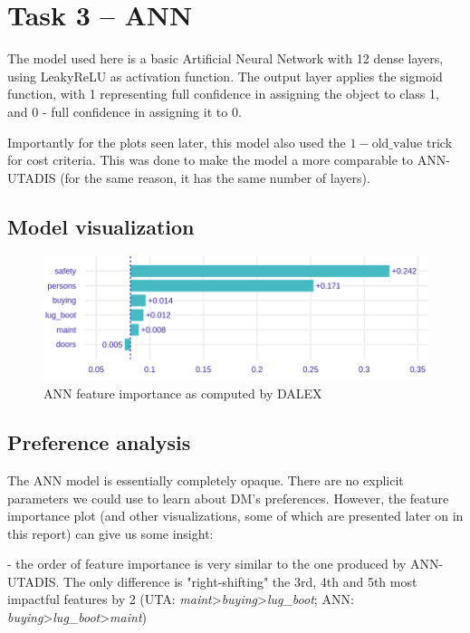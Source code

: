 \documentclass[../main.tex]{subfiles}
\begin{document}
\section{Task 3 -- ANN}

The model used here is a basic Artificial Neural Network with 12 dense layers,
using LeakyReLU as activation function. The output layer applies the sigmoid
function, with 1 representing full confidence in assigning the object to class 1, and 0
- full confidence in assigning it to 0.

Importantly for the plots seen later, this model also used the
$1-\mathrm{old\_value}$ trick for cost criteria. This was done to make the model
a more comparable to ANN-UTADIS (for the same reason, it has the same number of layers).

\subsection{Model visualization}
\begin{figure}[H]
    \centering
    \includegraphics[width=\linewidth]{../img/ANN-feature-importance.png}
    \caption{ANN feature importance as computed by DALEX}
    \label{fig:ANN-feats}
\end{figure}

\subsection{Preference analysis}

The ANN model is essentially completely opaque. There are no explicit parameters
we could use to learn about DM's preferences.
However, the feature importance plot (and other visualizations, some of which are presented
later on in this report) can give us some insight:

- the order of feature importance is very similar to the one produced by ANN-UTADIS.
The only difference is "right-shifting" the 3rd, 4th and 5th most impactful features by 2
(UTA: \emph{maint}>\emph{buying}>\emph{lug\_boot}; ANN: \emph{buying}>\emph{lug\_boot}>\emph{maint})
\end{document}
